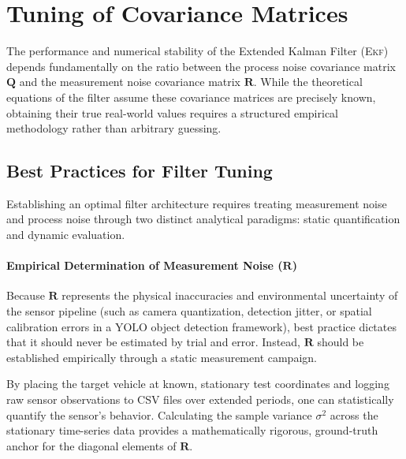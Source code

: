 \section{Tuning of Covariance Matrices}
\label{sec:tuning_q_r}

The performance and numerical stability of the Extended Kalman Filter (\textsc{Ekf}) depends fundamentally on the ratio between the process noise covariance matrix $\mathbf{Q}$ and the measurement noise covariance matrix $\mathbf{R}$.%
While the theoretical equations of the filter assume these covariance matrices are precisely known, obtaining their true real-world values requires a structured empirical methodology rather than arbitrary guessing.

\subsection{Best Practices for Filter Tuning}

Establishing an optimal filter architecture requires treating measurement noise and process noise through two distinct analytical paradigms: static quantification and dynamic evaluation.

\paragraph{Empirical Determination of Measurement Noise ($\mathbf{R}$)}
Because $\mathbf{R}$ represents the physical inaccuracies and environmental uncertainty of the sensor pipeline (such as camera quantization, detection jitter, or spatial calibration errors in a YOLO object detection framework), best practice dictates that it should never be estimated by trial and error. Instead, $\mathbf{R}$ should be established empirically through a static measurement campaign.%

By placing the target vehicle at known, stationary test coordinates and logging raw sensor observations to CSV files over extended periods, one can statistically quantify the sensor's behavior. Calculating the sample variance $\sigma^2$ across the stationary time-series data provides a mathematically rigorous, ground-truth anchor for the diagonal elements of $\mathbf{R}$.

